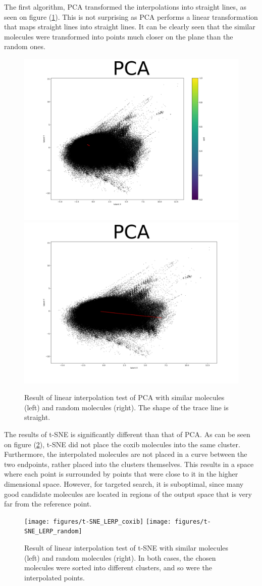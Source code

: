 The first algorithm, PCA transformed the interpolations into straight lines, as seen on figure (\ref{fig:pca:lerp}). This is not surprising as PCA performs a linear transformation that maps straight lines into straight lines. It can be clearly seen that the similar molecules were transformed into points much closer on the plane than the random ones.

\begin{figure}[h]
	\centering
	\includegraphics[width=0.49\columnwidth]{figures/PCA_LERP_coxib}
	\includegraphics[width=0.49\columnwidth]{figures/PCA_LERP_random}
	\caption{Result of linear interpolation test of PCA with similar molecules (left) and random molecules (right). The shape of the trace line is straight.}
	\label{fig:pca:lerp}
\end{figure}

The results of t-SNE is significantly different than that of PCA. As can be seen on figure (\ref{fig:tsne:lerp}), t-SNE did not place the coxib molecules into the same cluster. Furthermore, the interpolated molecules are not placed in a curve between the two endpoints, rather placed into the clusters themselves. This results in a space where each point is surrounded by points that were close to it in the higher dimensional space. However, for targeted search, it is suboptimal, since many good candidate molecules are located in regions of the output space that is very far from the reference point.

\begin{figure}[h]
	\centering
	\texttt{[image: figures/t-SNE\_LERP\_coxib]}
	\texttt{[image: figures/t-SNE\_LERP\_random]}
	\caption{Result of linear interpolation test of t-SNE with similar molecules (left) and random molecules (right). In both cases, the chosen molecules were sorted into different clusters, and so were the interpolated points.}
	\label{fig:tsne:lerp}
\end{figure}

